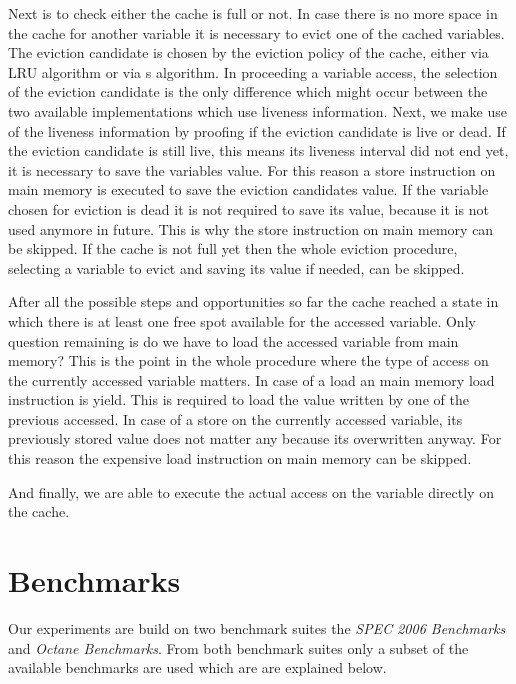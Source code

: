 \documentclass[onecolumn, openright, master, english, signatures]{dbrgrptt}
\begin{document}
Next is to check either the cache is full or not. In case there is no more space in the cache for another variable it is necessary to evict one of the cached variables. The eviction candidate is chosen by the eviction policy of the cache, either via \ac{LRU} algorithm or via s algorithm. In proceeding a variable access, the selection of the eviction candidate is the only difference which might occur between the two available implementations which use liveness information. Next, we make use of the liveness information by proofing if the eviction candidate is live or dead. If the eviction candidate is still live, this means its liveness interval did not end yet, it is necessary to save the variables value. For this reason a store instruction on main memory is executed to save the eviction candidates value. If the variable chosen for eviction is dead it is not required to save its value, because it is not used anymore in future. This is why the store instruction on main memory can be skipped.
If the cache is not full yet then the whole eviction procedure, selecting a variable to evict and saving its value if needed, can be skipped.

After all the possible steps and opportunities so far the cache reached a state in which there is at least one free spot available for the accessed variable. Only question remaining is do we have to load the accessed variable from main memory? This is the point in the whole procedure where the type of access on the currently accessed variable matters. In case of a load an main memory load instruction is yield. This is required to load the value written by one of the previous accessed. In case of a store on the currently accessed variable, its previously stored value does not matter any because its overwritten anyway. For this reason the expensive load instruction on main memory can be skipped.

And finally, we are able to execute the actual access on the variable directly on the cache.


\section{Benchmarks}\label{sec:benchmarks}

Our experiments are build on two benchmark suites the \emph{SPEC 2006 Benchmarks}\cite{henning2006spec} and \emph{Octane Benchmarks}\cite{v8benchmarks}. From both benchmark suites only a subset of the available benchmarks are used which are are explained below.
\end{document}
